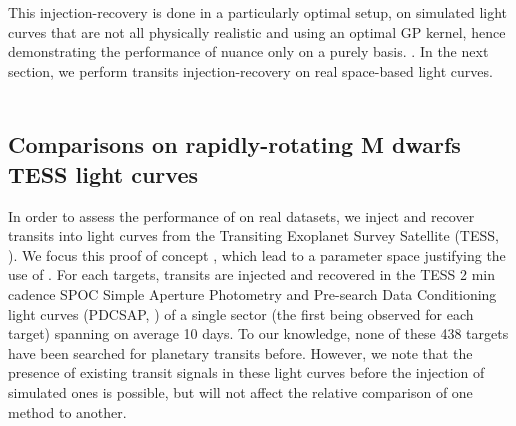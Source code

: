 \documentclass[modern]{aastex631}
\begin{document}
\noindent This injection-recovery is done in a particularly optimal setup, on simulated light curves that are not all physically realistic and using an optimal GP kernel, hence demonstrating the performance of \textsf{nuance} only on a purely  basis. . In the next section, we perform transits injection-recovery on real space-based light curves.\\\\
\subsection{Comparisons on rapidly-rotating M dwarfs TESS light curves}\label{real}
In order to assess the performance of \nuance{} on real datasets, we inject and recover transits into light curves from the Transiting Exoplanet Survey Satellite (TESS, \citealt{tess}). We focus this proof of concept  \citep{Ramsay2020}, which lead to a parameter space justifying the use of \nuance{}. For each  targets, transits are injected and recovered in the TESS 2 min cadence SPOC Simple Aperture Photometry and Pre-search Data Conditioning light curves (PDCSAP, \citealt{spoc}) of a single sector (the first being observed for each target) spanning on average 10 days. To our knowledge, none of these 438 targets have been searched for planetary transits before. However, we note that the presence of existing transit signals in these light curves before the injection of simulated ones is possible, but will not affect the relative  comparison of one method to another. \\\\
\end{document}
